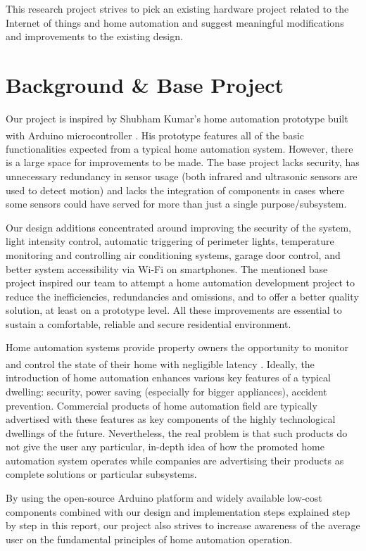 \documentclass[journal,onecolumn]{IEEEtran}
\begin{document}
This research project strives to pick an existing hardware project related to the Internet of things and home automation and suggest meaningful modifications and improvements to the existing design.

\section{Background \& Base Project}

Our project is inspired by Shubham Kumar's home automation prototype built with Arduino microcontroller \textsuperscript{\cite{IEEEhowto:Kumar}}. His prototype features all of the basic functionalities expected from a typical home automation system. However, there is a large space for improvements to be made. The base project lacks security, has unnecessary redundancy in sensor usage (both infrared and ultrasonic sensors are used to detect motion) and lacks the integration of components in cases where some sensors could have served for more than just a single purpose/subsystem. 

Our design additions concentrated around improving the security of the system, light intensity control, automatic triggering of perimeter lights, temperature monitoring and controlling air conditioning systems, garage door control, and better system accessibility via Wi-Fi on smartphones. The mentioned base project inspired our team to attempt a home automation development project to reduce the inefficiencies, redundancies and omissions, and to offer a better quality solution, at least on a prototype level.  All these improvements are essential to sustain a comfortable, reliable and secure residential environment.

Home automation systems provide property owners the opportunity to monitor and control the state of their home with negligible latency \textsuperscript{\cite{IEEEhowto:Pavithra}}. Ideally, the introduction of home automation enhances various key features of a typical dwelling: security, power saving (especially for bigger appliances), accident prevention. Commercial products of home automation field are typically advertised with these features as key components of the highly technological dwellings of the future. Nevertheless, the real problem is that such products do not give the user any particular, in-depth idea of how the promoted home automation system operates while companies are advertising their products as complete solutions or particular subsystems. 

By using the open-source Arduino platform and widely available low-cost components combined with our design and implementation steps explained step by step in this report, our project also strives to increase awareness of the average user on the fundamental principles of home automation operation.
\end{document}
